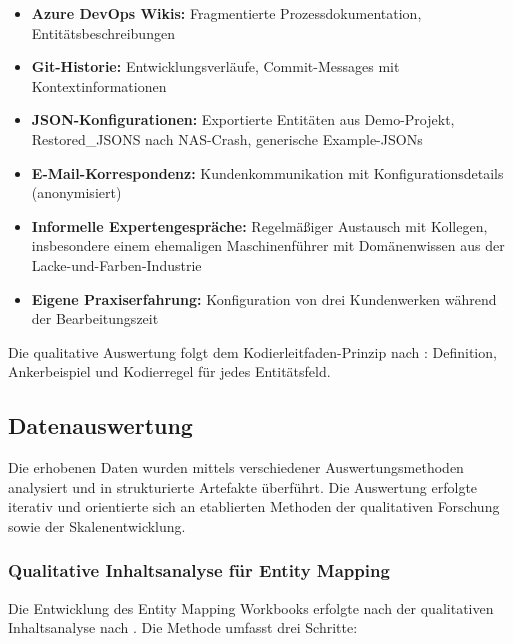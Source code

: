\begin{itemize}
    \item \textbf{Azure DevOps Wikis:} Fragmentierte Prozessdokumentation, Entitätsbeschreibungen
    \item \textbf{Git-Historie:} Entwicklungsverläufe, Commit-Messages mit Kontextinformationen
    \item \textbf{JSON-Konfigurationen:} Exportierte Entitäten aus Demo-Projekt, Restored\_JSONS nach NAS-Crash, generische Example-JSONs
    \item \textbf{E-Mail-Korrespondenz:} Kundenkommunikation mit Konfigurationsdetails (anonymisiert)
    \item \textbf{Informelle Expertengespräche:} Regelmäßiger Austausch mit Kollegen, insbesondere einem ehemaligen Maschinenführer mit Domänenwissen aus der Lacke-und-Farben-Industrie
    \item \textbf{Eigene Praxiserfahrung:} Konfiguration von drei Kundenwerken während der Bearbeitungszeit
\end{itemize}

Die qualitative Auswertung folgt dem Kodierleitfaden-Prinzip nach \cite{mayring:qualitative2015}: Definition, Ankerbeispiel und Kodierregel für jedes Entitätsfeld.


\subsection{Datenauswertung}
\label{subsec:Datenauswertung}

Die erhobenen Daten wurden mittels verschiedener Auswertungsmethoden analysiert und in strukturierte Artefakte überführt. Die Auswertung erfolgte iterativ und orientierte sich an etablierten Methoden der qualitativen Forschung sowie der Skalenentwicklung.

\subsubsection{Qualitative Inhaltsanalyse für Entity Mapping}
\label{subsubsec:QualitativeInhaltsanalyse}

Die Entwicklung des Entity Mapping Workbooks erfolgte nach der qualitativen Inhaltsanalyse nach \cite{mayring:qualitative2015}. Die Methode umfasst drei Schritte:

